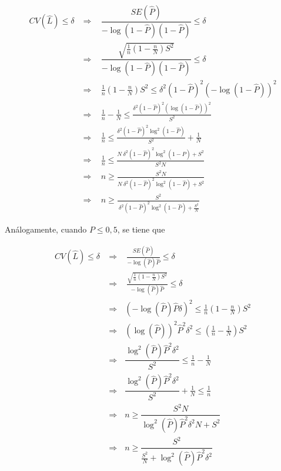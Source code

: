 \documentclass[
  10pt,
  spanish,
]{book}
\begin{document}
\begin{align*}
CV(\hat{L}) \leq \delta 
&\Longrightarrow \ \ \ \ \dfrac{SE(\hat{P})}{-\log(1-\hat{P})(1-\hat{P})} \leq \delta \\
&\Longrightarrow \ \ \ \ \dfrac{\sqrt{\frac{1}{n}(1-\frac{n}{N})S^2}}{-\log (1-\hat{P})(1-\hat{P})} \leq \delta \\
&\Longrightarrow \ \ \ \ 
\frac{1}{n}(1-\frac{n}{N})S^2 \leq \delta^2 (1-\hat{P})^2(-\log (1-\hat{P}))^2 \\ 
&\Longrightarrow \ \ \ \ 
\frac{1}{n}-\frac{1}{N} \leq \frac{\delta^2 (1-\hat{P})^2(\log (1-\hat{P}))^2}{S^2} \\
&\Longrightarrow \ \ \ \ 
\frac{1}{n} \leq \frac{\delta^2 (1-\hat{P})^2\log^2(1-\hat{P})}{S^2} + \frac{1}{N} \\ 
&\Longrightarrow \ \ \ \ 
\frac{1}{n} \leq \frac{N\ \delta^2(1-\hat{P})^2\log^2(1-\hat{P}) +S^2}{S^2N} \\
&\Longrightarrow \ \ \ \ 
n \geq \frac{S^2N}{N\ \delta^2(1-\hat{P})^2\log^2(1-\hat{P}) +S^2} \\
&\Longrightarrow \ \ \ \ 
n \geq \frac{S^2}{\ \delta^2(1-\hat{P})^2\log^2(1-\hat{P}) +\frac{S^2}{N}}
\end{align*}

Análogamente, cuando \(P \leq 0,5\), se tiene que

\begin{align*}
CV(\hat{L}) \leq \delta
&\Longrightarrow \ \ \ \ 
\frac{SE(\hat{P})}{-\log(\hat{P})\hat{P}} \leq \delta \\
&\Longrightarrow \ \ \ \ 
\frac{\sqrt{\frac{1}{n}(1-\frac{n}{N})S^2}}{-\log(\hat{P})\hat{P}}\leq \delta \\
&\Longrightarrow \ \ \ 
(-\log (\hat{P})\hat{P}\delta)^2 \leq \frac{1}{n}(1-\frac{n}{N})S^2 \\
&\Longrightarrow \ \ \ 
(\log (\hat{P}))^2\hat{P}^2\delta^2 \leq (\frac{1}{n}-\frac{1}{N})S^2 \\
&\Longrightarrow \ \ \ 
\dfrac{\log^2(\hat{P})\hat{P}^2\delta^2}{S^2} \leq \frac{1}{n} - \frac{1}{N} \\
&\Longrightarrow \ \ \ 
\dfrac{\log^2(\hat{P})\hat{P}^2\delta^2}{S^2} + \frac{1}{N} \leq \frac{1}{n} \\ 
&\Longrightarrow \ \ \ 
n \geq \dfrac{S^2N}{\log^2(\hat{P})\hat{P}^2\delta^2N + S^2}\\
&\Longrightarrow \ \ \ 
n \geq \dfrac{S^2}{\frac{S^2}{N}+\log^2(\hat{P})\hat{P}^2\delta^2}
\end{align*}
\end{document}
